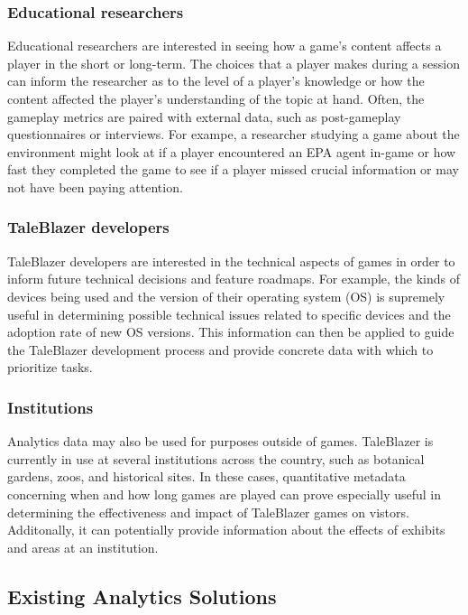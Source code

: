 \subsubsection{Educational researchers}

Educational researchers are interested in seeing how a game's content affects a player in the short or long-term. The choices that a player makes during a session can inform the researcher as to the level of a player's knowledge or how the content affected the player's understanding of the topic at hand. Often, the gameplay metrics are paired with external data, such as post-gameplay questionnaires or interviews. For exampe, a researcher studying a game about the environment might look at if a player encountered an EPA agent in-game or how fast they completed the game to see if a player missed crucial information or may not have been paying attention.

\subsubsection{TaleBlazer developers}

TaleBlazer developers are interested in the technical aspects of games in order to inform future technical decisions and feature roadmaps. For example, the kinds of devices being used and the version of their operating system (OS) is supremely useful in determining possible technical issues related to specific devices and the adoption rate of new OS versions. This information can then be applied to guide the TaleBlazer development process and provide concrete data with which to prioritize tasks. 

\subsubsection{Institutions}

Analytics data may also be used for purposes outside of games. TaleBlazer is currently in use at several institutions across the country, such as botanical gardens, zoos, and historical sites. In these cases, quantitative metadata concerning when and how long games are played can prove especially useful in determining the effectiveness and impact of TaleBlazer games on vistors. Additonally, it can potentially provide information about the effects of exhibits and areas at an institution.

\subsection{Existing Analytics Solutions}


